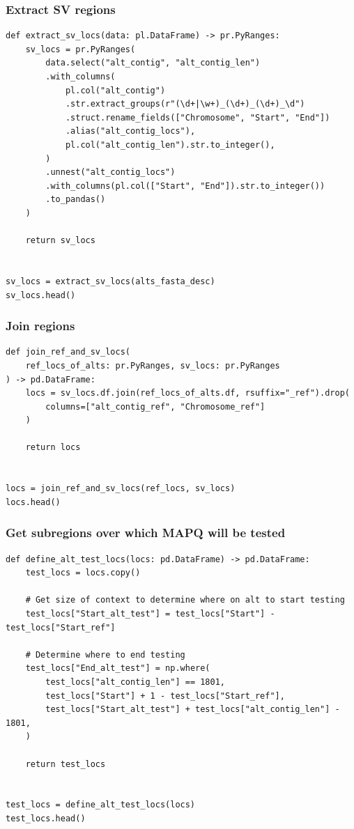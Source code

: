 \documentclass{article}
\begin{document}
\subsubsection{Extract SV regions}

\begin{verbatim}
def extract_sv_locs(data: pl.DataFrame) -> pr.PyRanges:
    sv_locs = pr.PyRanges(
        data.select("alt_contig", "alt_contig_len")
        .with_columns(
            pl.col("alt_contig")
            .str.extract_groups(r"(\d+|\w+)_(\d+)_(\d+)_\d")
            .struct.rename_fields(["Chromosome", "Start", "End"])
            .alias("alt_contig_locs"),
            pl.col("alt_contig_len").str.to_integer(),
        )
        .unnest("alt_contig_locs")
        .with_columns(pl.col(["Start", "End"]).str.to_integer())
        .to_pandas()
    )

    return sv_locs


sv_locs = extract_sv_locs(alts_fasta_desc)
sv_locs.head()
\end{verbatim}

\subsubsection{Join regions}

\begin{verbatim}
def join_ref_and_sv_locs(
    ref_locs_of_alts: pr.PyRanges, sv_locs: pr.PyRanges
) -> pd.DataFrame:
    locs = sv_locs.df.join(ref_locs_of_alts.df, rsuffix="_ref").drop(
        columns=["alt_contig_ref", "Chromosome_ref"]
    )

    return locs


locs = join_ref_and_sv_locs(ref_locs, sv_locs)
locs.head()
\end{verbatim}

\subsubsection{Get subregions over which MAPQ will be tested}

\begin{verbatim}
def define_alt_test_locs(locs: pd.DataFrame) -> pd.DataFrame:
    test_locs = locs.copy()

    # Get size of context to determine where on alt to start testing
    test_locs["Start_alt_test"] = test_locs["Start"] - test_locs["Start_ref"]

    # Determine where to end testing
    test_locs["End_alt_test"] = np.where(
        test_locs["alt_contig_len"] == 1801,
        test_locs["Start"] + 1 - test_locs["Start_ref"],
        test_locs["Start_alt_test"] + test_locs["alt_contig_len"] - 1801,
    )

    return test_locs


test_locs = define_alt_test_locs(locs)
test_locs.head()
\end{verbatim}
\end{document}
